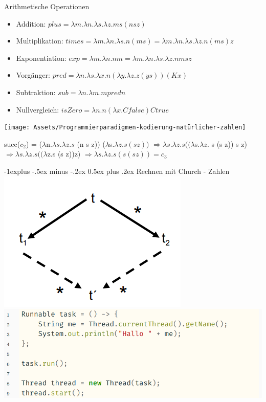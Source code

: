 \documentclass[10pt]{article}
\makeatletter
\renewcommand{\subsection}{\@startsection{subsection}{2}{0mm}%
                                {-1explus -.5ex minus -.2ex}%
                                {0.5ex plus .2ex}%
                                {\normalfont\normalsize\bfseries}}
\makeatother
\begin{document}
  Arithmetische Operationen
  \begin{itemize}
    \item Addition:   $plus = \lambda m. \lambda n. \lambda s. \lambda z. m s (n s z)$
    \item Multiplikation: $times = \lambda m. \lambda n. \lambda s. n (m s) = \lambda m. \lambda n. \lambda s. \lambda z. n (m s) z$
    \item Exponentiation: $exp = \lambda m. \lambda n. n m = \lambda m. \lambda n. \lambda s. \lambda z. n m s z$
    \item Vorgänger:  $pred = \lambda n.\lambda s.\lambda x. n (\lambda y.\lambda z. z (y s))(K x)$
    \item Subtraktion: $sub = \lambda n.\lambda m. m pred n$
    \item Nullvergleich: $isZero = \lambda n. n (\lambda x. C false ) C true$
  \end{itemize}
  \begin{center}
    \texttt{[image: Assets/Programmierparadigmen-kodierung-natürlicher-zahlen]}
  \end{center}
  
  succ($c_2$) = ($\lambda$\color{blue}n\color{black}.$\lambda s.\lambda z.s$ (\color{blue}n\color{black} s z)) \color{red} ($\lambda$s.$\lambda z.s (s z))$ \color{black}
  \subitem $\Rightarrow\lambda s.\lambda z.s ((\lambda$\color{blue}s\color{black}.$\lambda z.$ \color{blue} s \color{black}(\color{blue}s\color{black} z)) s z)
  \subitem $\Rightarrow\lambda s.\lambda z.s((\lambda$\color{blue}z\color{black}.s (s \color{blue}z\color{black}))\color{red}z\color{black})
  \subitem $\Rightarrow\lambda s.\lambda z.s(s(s z)) = c_3$

  \subsection{Rechnen mit Church - Zahlen }
  \includegraphics[width=0.4\linewidth]{Assets/Programmierparadigmen-diamant-eigenschaft}
  \includegraphics[width=0.4\linewidth]{Assets/Programmierparadigmen-code-snippet-01.png}
  
\end{document}
